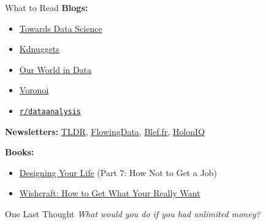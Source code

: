 \documentclass[10pt,a4paper]{article}
\begin{document}
\begin{multicols}{3}
\begin{textbox}{What to Read}
\textbf{Blogs:}
\begin{itemize}
    \item \href{https://towardsdatascience.com/}{Towards Data Science}
    \item \href{https://www.kdnuggets.com/}{Kdnuggets}
    \item \href{https://ourworldindata.org/}{Our World in Data}
    \item \href{https://www.voronoiapp.com/}{Voronoi}
    \item \href{https://reddit.com/r/dataanalysis/}{\texttt{r/dataanalysis}}
\end{itemize}
\textbf{Newsletters:} \href{https://tldr.tech/newsletters}{TLDR}, \href{https://flowingdata.com/newsletter/}{FlowingData}, \href{https://www.blef.fr/}{Blef.fr}, \href{https://www.holoniq.com/newsletters}{HolonIQ}

\textbf{Books:}
\begin{itemize}
    \item \href{https://www.amazon.com/Designing-Your-Life-Well-Lived-Joyful/dp/1101923083}{Designing Your Life} (Part 7: How Not to Get a Job)
    \item \href{https://www.amazon.com/Wishcraft-How-What-Really-Want/dp/0345465180}{Wishcraft: How to Get What Your Really Want}
\end{itemize}
\end{textbox}

\begin{textbox}{One Last Thought}
\emph{What would you do if you had unlimited money?}
\end{textbox}


\date{\today}
\end{multicols}
\end{document}
